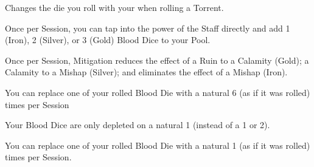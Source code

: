 {\newpage




Changes the die you roll with your \INT when rolling a Torrent. 


Once per Session, you can tap into the power of the Staff directly and add 1 (Iron), 2 (Silver), or 3 (Gold) Blood Dice to your Pool.


Once per Session, Mitigation reduces the effect of a Ruin to a Calamity (Gold); a Calamity to a Mishap (Silver); and eliminates the effect of a Mishap (Iron).


You can replace one of your rolled Blood Die with a natural 6 (as if it was rolled) \mybold{[num]} times per Session  


Your Blood Dice are only depleted on a natural 1 (instead of a 1 or 2). 


You can replace one of your rolled Blood Die with a natural 1 (as if it was rolled) \mybold{[num]} times per Session.




} %
